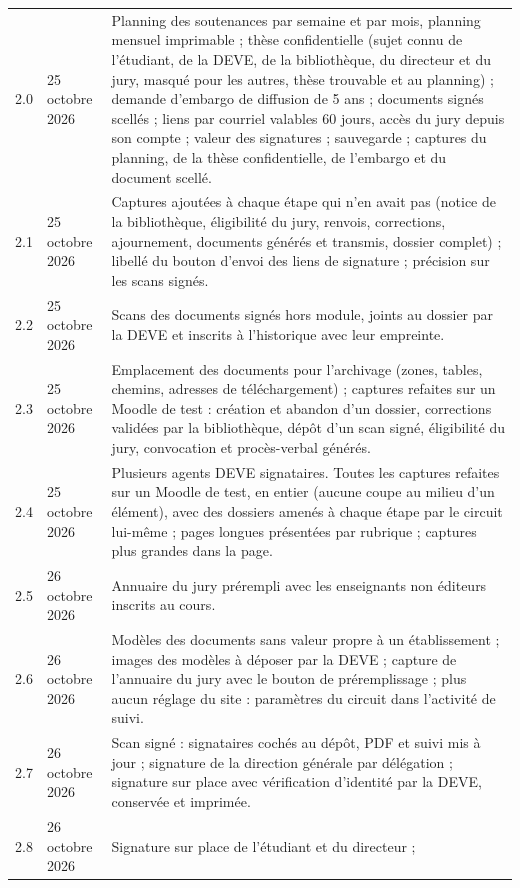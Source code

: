 \documentclass[11pt,a4paper]{article}
\begin{document}
\begin{center}
\begin{tabularx}{\linewidth}{@{}l l X@{}}
2.0 & 25 octobre 2026 & Planning des soutenances par semaine et par mois,
planning mensuel imprimable ; thèse confidentielle (sujet connu de l'étudiant,
de la DEVE, de la bibliothèque, du directeur et du jury, masqué pour les autres,
thèse trouvable et au planning) ; demande d'embargo de diffusion de 5 ans ;
documents signés scellés ; liens par courriel valables 60 jours, accès du jury
depuis son compte ; valeur des signatures ; sauvegarde ; captures du planning,
de la thèse confidentielle, de l'embargo et du document scellé. \\
2.1 & 25 octobre 2026 & Captures ajoutées à chaque étape qui n'en avait pas
(notice de la bibliothèque, éligibilité du jury, renvois, corrections,
ajournement, documents générés et transmis, dossier complet) ; libellé du
bouton d'envoi des liens de signature ; précision sur les scans signés. \\
2.2 & 25 octobre 2026 & Scans des documents signés hors module, joints au
dossier par la DEVE et inscrits à l'historique avec leur empreinte. \\
2.3 & 25 octobre 2026 & Emplacement des documents pour l'archivage (zones,
tables, chemins, adresses de téléchargement) ; captures refaites sur un Moodle de
test : création et abandon d'un dossier, corrections validées par la
bibliothèque, dépôt d'un scan signé, éligibilité du jury, convocation et
procès-verbal générés. \\
2.4 & 25 octobre 2026 & Plusieurs agents DEVE signataires. Toutes les captures
refaites sur un Moodle de test, en entier (aucune coupe au milieu d'un élément),
avec des dossiers amenés à chaque étape par le circuit lui-même ; pages longues
présentées par rubrique ; captures plus grandes dans la page. \\
2.5 & 26 octobre 2026 & Annuaire du jury prérempli avec les enseignants non
éditeurs inscrits au cours. \\
2.6 & 26 octobre 2026 & Modèles des documents sans valeur propre à un
établissement ; images des modèles à déposer par la DEVE ; capture de
l'annuaire du jury avec le bouton de préremplissage ; plus aucun réglage du
site : paramètres du circuit dans l'activité de suivi. \\
2.7 & 26 octobre 2026 & Scan signé : signataires cochés au dépôt, PDF et suivi
mis à jour ; signature de la direction générale par délégation ; signature sur
place avec vérification d'identité par la DEVE, conservée et imprimée. \\
2.8 & 26 octobre 2026 & Signature sur place de l'étudiant et du directeur ;

\end{tabularx}
\end{center}
\end{document}
